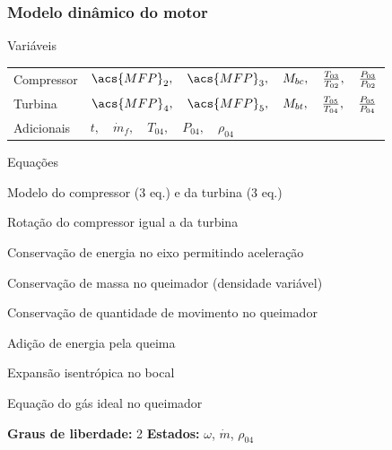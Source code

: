 \documentclass[aspectratio=1610]{beamer}
\begin{document}
\begin{frame}
    \frametitle{Modelo dinâmico do motor}

    \begin{block}{Variáveis}
        \begin{tabular}{ll}
            Compressor & $ \acs{MFP}_2, \quad \acs{MFP}_3, \quad M_{bc}, \quad \tr{03}{02}, \quad \pr{03}{02}$ \\
            Turbina    & $ \acs{MFP}_4, \quad \acs{MFP}_5, \quad M_{bt}, \quad \tr{05}{04}, \quad \pr{05}{04}$ \\
            Adicionais & $ t, \quad \dot{m}_f, \quad T_{04}, \quad P_{04}, \quad\rho_{04}$ \\
        \end{tabular}
    \end{block}
    \vfill
    \begin{block}{Equações}
    \begin{compactitem}
        \item Modelo do compressor (3 eq.) e da turbina (3 eq.)
        \item Rotação do compressor igual a da turbina
        \item Conservação de energia no eixo permitindo aceleração
        \item Conservação de massa no queimador (densidade variável)
        \item Conservação de quantidade de movimento no queimador
        \item Adição de energia pela queima
        \item Expansão isentrópica no bocal
        \item Equação do gás ideal no queimador
    \end{compactitem}
    \end{block}

    \textbf{Graus de liberdade:} 2 
    \hspace{6em}
    \textbf{Estados:} $\omega$, $\dot{m}$, $\rho_{04}$
\end{frame}
\end{document}

